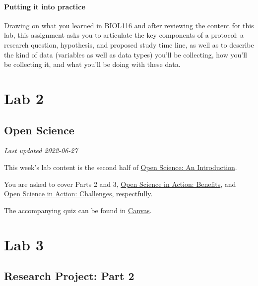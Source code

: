 \documentclass[
]{book}
\begin{document}
\hypertarget{putting-it-into-practice}{%
\subsection*{Putting it into practice}\label{putting-it-into-practice}}

Drawing on what you learned in BIOL116 and after reviewing the content for this lab, this assignment asks you to articulate the key components of a protocol: a research question, hypothesis, and proposed study time line, as well as to describe the kind of data (variables as well as data types) you'll be collecting, how you'll be collecting it, and what you'll be doing with these data.

\hypertarget{part-lab-2}{%
\part*{Lab 2}\label{part-lab-2}}

\hypertarget{open-science}{%
\chapter*{Open Science}\label{open-science}}

\emph{Last updated 2022-06-27}

This week's lab content is the second half of \href{https://ubco-biology.github.io/OS-Introduction/}{Open Science: An Introduction}.

You are asked to cover Parts 2 and 3, \href{https://ubco-biology.github.io/OS-Introduction/open-science-in-action-benefits.html}{Open Science in Action: Benefits}, and \href{https://ubco-biology.github.io/OS-Introduction/open-science-in-action-challenges.html}{Open Science in Action: Challenges}, respectfully.

The accompanying quiz can be found in \href{https://canvas.ubc.ca/courses/94573}{Canvas}.

\hypertarget{part-lab-3}{%
\part*{Lab 3}\label{part-lab-3}}

\hypertarget{research-project-part-2}{%
\chapter*{Research Project: Part 2}\label{research-project-part-2}}
\end{document}
